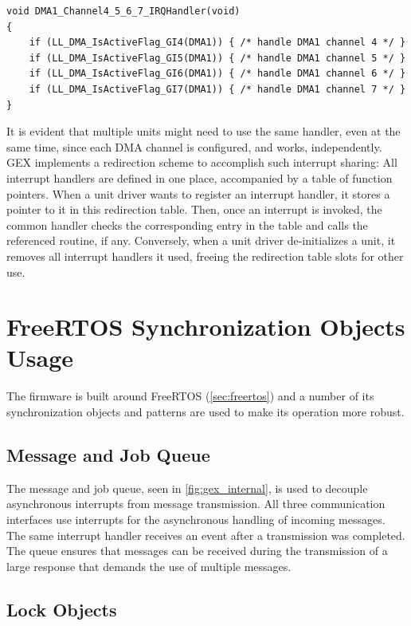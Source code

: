 \begin{verbatim}
void DMA1_Channel4_5_6_7_IRQHandler(void)
{
    if (LL_DMA_IsActiveFlag_GI4(DMA1)) { /* handle DMA1 channel 4 */ }
    if (LL_DMA_IsActiveFlag_GI5(DMA1)) { /* handle DMA1 channel 5 */ }
    if (LL_DMA_IsActiveFlag_GI6(DMA1)) { /* handle DMA1 channel 6 */ }
    if (LL_DMA_IsActiveFlag_GI7(DMA1)) { /* handle DMA1 channel 7 */ }
}
\end{verbatim}

It is evident that multiple units might need to use the same handler, even at the same time, since each \gls{DMA} channel is configured, and works, independently. GEX implements a redirection scheme to accomplish such interrupt sharing: All interrupt handlers are defined in one place, accompanied by a table of function pointers. When a unit driver wants to register an interrupt handler, it stores a pointer to it in this redirection table. Then, once an interrupt is invoked, the common handler checks the corresponding entry in the table and calls the referenced routine, if any. Conversely, when a unit driver de-initializes a unit, it removes all interrupt handlers it used, freeing the redirection table slots for other use.

\section{FreeRTOS Synchronization Objects Usage} \label{sec:rtos_in_gex}

The firmware is built around FreeRTOS (\cref{sec:freertos}) and a number of its synchronization objects and patterns are used to make its operation more robust.

\subsection{Message and Job Queue}

The message and job queue, seen in \cref{fig:gex_internal}, is used to decouple asynchronous interrupts from message transmission. All three communication interfaces use interrupts for the asynchronous handling of incoming messages. The same interrupt handler receives an event after a transmission was completed. The queue ensures that messages can be received during the transmission of a large response that demands the use of multiple messages.

\subsection{Lock Objects}

